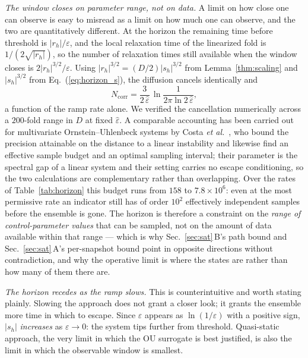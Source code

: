 \documentclass[%
 twocolumn,
 superscriptaddress,
 amsmath,amssymb,
 aps,
 pre,
 floatfix,
]{revtex4-2}
\newcommand{\Sig}{\hat\varepsilon}
\begin{document}
\emph{The window closes on parameter range, not on data.}  A limit on how close one can observe is easy to misread as a limit on how much one can observe, and the two are quantitatively different.  At the horizon the remaining time before threshold is $|r_h|/\varepsilon$, and the local relaxation time of the linearized fold is $1/(2\sqrt{|r_h|})$, so the number of relaxation times still available when the window closes is $2|r_h|^{3/2}/\varepsilon$.  Using $|r_h|^{3/2}=(D/2)|s_h|^{3/2}$ from Lemma~\ref{thm:scaling} and $|s_h|^{3/2}$ from Eq.~(\ref{eq:horizon_s}), the diffusion cancels identically and
\begin{equation}
\label{eq:budget}
N_{\mathrm{corr}}
=\frac{3}{2\,\Sig}\,\ln\frac{1}{2\pi\ln2\,\Sig} ,
\end{equation}
a function of the ramp rate alone.  We verified the cancellation numerically across a $200$-fold range in $D$ at fixed $\Sig$.  A comparable accounting has been carried out for multivariate Ornstein--Uhlenbeck systems by Costa \emph{et al.}~\cite{Costa2026}, who bound the precision attainable on the distance to a linear instability and likewise find an effective sample budget and an optimal sampling interval; their parameter is the spectral gap of a linear system and their setting carries no escape conditioning, so the two calculations are complementary rather than overlapping.  Over the rates of Table~\ref{tab:horizon} this budget runs from $158$ to $7.8\times10^{6}$: even at the most permissive rate an indicator still has of order $10^2$ effectively independent samples before the ensemble is gone.  The horizon is therefore a constraint on the \emph{range of control-parameter values} that can be sampled, not on the amount of data available within that range --- which is why Sec.~\ref{sec:sat}\,B's path bound and Sec.~\ref{sec:sat}\,A's per-snapshot bound point in opposite directions without contradiction, and why the operative limit is where the states are rather than how many of them there are.

\emph{The horizon recedes as the ramp slows.}  This is counterintuitive and worth stating plainly.  Slowing the approach does not grant a closer look; it grants the ensemble more time in which to escape.  Since $\varepsilon$ appears as $\ln(1/\varepsilon)$ with a positive sign, $|s_h|$ \emph{increases} as $\varepsilon\to0$: the system tips further from threshold.  Quasi-static approach, the very limit in which the OU surrogate is best justified, is also the limit in which the observable window is smallest.
\end{document}
